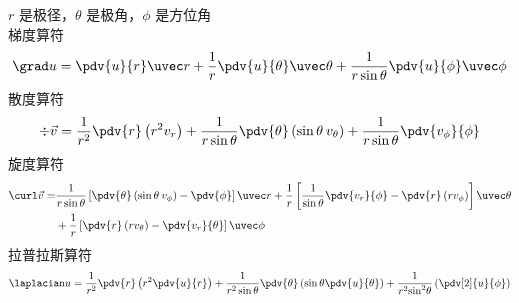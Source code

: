
$r$ 是极径，$\theta $ 是极角，$\phi $ 是方位角\\
 梯度算符
\begin{equation}
\grad u = \pdv{u}{r}\uvec r + \frac{1}{r} \pdv{u}{\theta}\uvec \theta  + \frac{1}{r\sin \theta }\pdv{u}{\phi}\uvec \phi
\end{equation}
 散度算符 
\begin{equation}
\div \vec v = \frac{1}{r^2} \pdv{r} \left( {{r^2}{v_r}} \right) + \frac{1}{r\sin \theta } \pdv{\theta} \left( {\sin \theta {\kern 1pt} {\kern 1pt} {v_\theta }} \right) + \frac{1}{r\sin \theta }\pdv{v_\phi}{\phi}
\end{equation}
 旋度算符
\begin{equation}
\begin{aligned}
\curl \vec v = & \frac{1}{r\sin \theta }\left[ {\pdv{\theta} \left( {\sin \theta {\kern 1pt} {\kern 1pt} {v_\phi }} \right) - \pdv{\phi}} \right]\uvec r  + \frac{1}{r}\left[ {\frac{1}{\sin \theta }\pdv{v_r}{\phi} - \pdv{r} \left( {r{v_\phi }} \right)} \right]\uvec \theta   \\
&+ \frac{1}{r}\left[ {\pdv{r} \left( {r{v_\theta }} \right) - \pdv{v_r}{\theta}} \right]\uvec \phi
\end{aligned}
\end{equation}
拉普拉斯算符
\begin{equation}
{\laplacian}u = \frac{1}{r^2}\pdv{r} \left( {{r^2} \pdv{u}{r}} \right) + \frac{1}{{r^2}\sin \theta } \pdv{\theta} \left( {\sin \theta \pdv{u}{\theta}} \right) + \frac{1}{{r^2}{{\sin }^2}\theta }\left( {\pdv[2]{u}{\phi}} \right)
\end{equation}
 